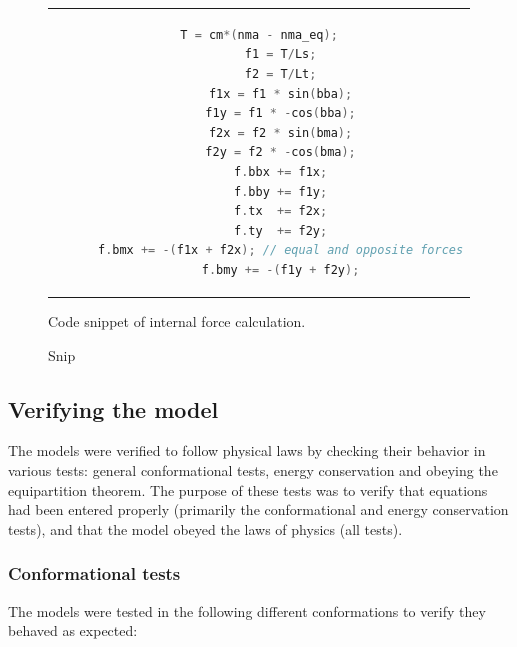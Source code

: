\documentclass[10pt]{article} %
\begin{document}
\begin{figure}[h]
  \centering
  \begin{tabular}{c}
    \begin{lstlisting}[language=C++]
      T = cm*(nma - nma_eq);
      f1 = T/Ls;
      f2 = T/Lt;
      f1x = f1 * sin(bba);
      f1y = f1 * -cos(bba);
      f2x = f2 * sin(bma);
      f2y = f2 * -cos(bma);
      f.bbx += f1x;
      f.bby += f1y;
      f.tx  += f2x;
      f.ty  += f2y;
      f.bmx += -(f1x + f2x); // equal and opposite forces
      f.bmy += -(f1y + f2y);
    \end{lstlisting}
  \end{tabular}
  \caption{Snip}{Code snippet of internal force calculation.}
  \label{transition-rate-snippet}
\end{figure}

\subsection{Verifying the model}
The models were verified to follow physical laws by checking their behavior in various tests: general conformational tests, energy conservation and obeying the equipartition theorem. The purpose of these tests was to verify that equations had been entered properly (primarily the conformational and energy conservation tests), and that the model obeyed the laws of physics (all tests).


\subsubsection{Conformational tests}
The models were tested in the following different conformations to verify they behaved as expected:\\
\end{document}
